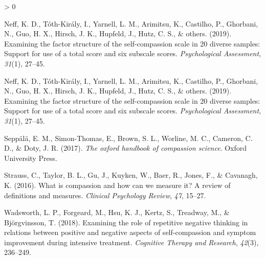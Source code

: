 \documentclass[
  english,
  man,floatsintext]{apa7}
\newlength{\cslhangindent}
\newenvironment{CSLReferences}[2] %
 {%
  \setlength{\parindent}{0pt}
  \ifodd #1 \everypar{\setlength{\hangindent}{\cslhangindent}}\ignorespaces\fi
  \ifnum #2 > 0
  \setlength{\parskip}{#2\baselineskip}
  \fi
 }%
 {}
\begin{document}
\begin{CSLReferences}{1}{0}
\leavevmode\hypertarget{ref-neff2019examining}{}%
Neff, K. D., Tóth-Király, I., Yarnell, L. M., Arimitsu, K., Castilho, P., Ghorbani, N., Guo, H. X., Hirsch, J. K., Hupfeld, J., Hutz, C. S., \& others. (2019). Examining the factor structure of the self-compassion scale in 20 diverse samples: Support for use of a total score and six subscale scores. \emph{Psychological Assessment}, \emph{31}(1), 27--45.

\leavevmode\hypertarget{ref-neff2019examining}{}%
Neff, K. D., Tóth-Király, I., Yarnell, L. M., Arimitsu, K., Castilho, P., Ghorbani, N., Guo, H. X., Hirsch, J. K., Hupfeld, J., Hutz, C. S., \& others. (2019). Examining the factor structure of the self-compassion scale in 20 diverse samples: Support for use of a total score and six subscale scores. \emph{Psychological Assessment}, \emph{31}(1), 27--45.

\leavevmode\hypertarget{ref-seppala2017oxford}{}%
Seppälä, E. M., Simon-Thomas, E., Brown, S. L., Worline, M. C., Cameron, C. D., \& Doty, J. R. (2017). \emph{The oxford handbook of compassion science}. Oxford University Press.

\leavevmode\hypertarget{ref-strauss2016compassion}{}%
Strauss, C., Taylor, B. L., Gu, J., Kuyken, W., Baer, R., Jones, F., \& Cavanagh, K. (2016). What is compassion and how can we measure it? A review of definitions and measures. \emph{Clinical Psychology Review}, \emph{47}, 15--27.

\leavevmode\hypertarget{ref-wadsworth2018examining}{}%
Wadsworth, L. P., Forgeard, M., Hsu, K. J., Kertz, S., Treadway, M., \& Björgvinsson, T. (2018). Examining the role of repetitive negative thinking in relations between positive and negative aspects of self-compassion and symptom improvement during intensive treatment. \emph{Cognitive Therapy and Research}, \emph{42}(3), 236--249.

\end{CSLReferences}

\endgroup

\renewcommand{\appendixname}{Supplementary Information}


\clearpage
\makeatletter
\efloat@restorefloats
\makeatother
\end{document}
